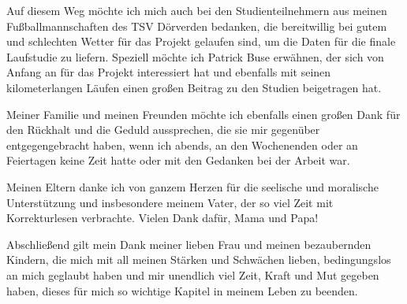 Auf diesem Weg möchte ich mich auch bei den Studienteilnehmern aus meinen Fußballmannschaften des TSV Dörverden bedanken, die bereitwillig bei gutem und schlechten Wetter für das Projekt gelaufen sind, um die Daten für die finale Laufstudie zu liefern. Speziell möchte ich Patrick Buse erwähnen, der sich von Anfang an für das Projekt interessiert hat und ebenfalls mit seinen kilometerlangen Läufen einen großen Beitrag zu den Studien beigetragen hat.

Meiner Familie und meinen Freunden möchte ich ebenfalls einen großen Dank für den Rückhalt und die Geduld aussprechen, die sie mir gegenüber entgegengebracht haben, wenn ich abends, an den Wochenenden oder an Feiertagen keine Zeit hatte oder mit den Gedanken bei der Arbeit war. 

Meinen Eltern danke ich von ganzem Herzen für die seelische und moralische Unterstützung und insbesondere meinem Vater, der so viel Zeit mit Korrekturlesen verbrachte. Vielen Dank dafür, Mama und Papa! 

Abschließend gilt mein Dank meiner lieben Frau und meinen bezaubernden Kindern, die mich mit all meinen Stärken und Schwächen lieben, bedingungslos an mich geglaubt haben und mir unendlich viel Zeit, Kraft und Mut gegeben haben, dieses für mich so wichtige Kapitel in meinem Leben zu beenden. 